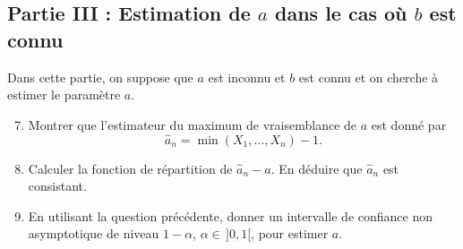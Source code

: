 \begin{mdframed}
\begin{exercice}
\subsection*{Partie III : Estimation de $a$ dans le cas où $b$ est connu}
Dans cette partie, on suppose que $a$ est inconnu et $b$ est connu et on cherche à estimer le paramètre $a$.
\begin{enumerate}
    \setcounter{enumi}{6}
    \item Montrer que l'estimateur du maximum de vraisemblance de $a$ est donné par
    \begin{equation*}
    \hat{a}_n = \min(X_1, \dots, X_n) - 1.
    \end{equation*}
    \item Calculer la fonction de répartition de $\hat{a}_n - a$. En déduire que $\hat{a}_n$ est consistant.
    \item En utilisant la question précédente, donner un intervalle de confiance non asymptotique de niveau $1 - \alpha$, $\alpha \in \, ]0, 1[$, pour estimer $a$.
\end{enumerate}
\end{exercice}
\end{mdframed}

\smallskip

